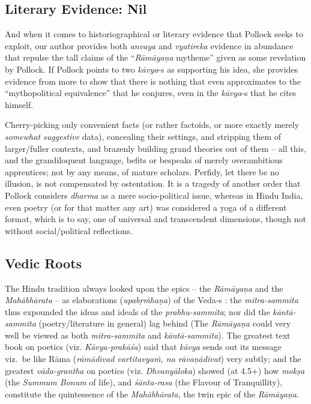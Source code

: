 \subsection*{Literary Evidence: Nil}

And when it comes to historiographical or literary evidence that Pollock seeks to exploit, our author provides both {\sl anvaya} and {\sl vyatireka} evidence in abundance that repulse the tall claims of  the “{\sl Rāmāyaṇa} mytheme” given as some revelation by Pollock. If Pollock points to two {\sl kāvya}-s as supporting his idea, she provides evidence from more to show that there is nothing that even approximates to the “mythopolitical equivalence” that he conjures, even in the {\sl kāvya}-s that he cites himself.

Cherry-picking only convenient facts (or rather factoids, or more exactly merely {\sl somewhat suggestive} data), concealing their settings, and stripping them of larger/fuller contexts, and brazenly building grand theories out of them -- all this, and the grandiloquent language, befits or bespeaks of merely overambitious apprentices; not by any means, of mature scholars. Perfidy, let there be no illusion, is not compensated by ostentation. It is a tragedy of another order that Pollock considers {\sl dharma} as a mere socio-political issue, whereas in Hindu India, even poetry (or for that matter any art) was considered a yoga of a different format, which is to say, one of universal and transcendent dimensions, though not without social/political reflections.\\[-20pt] 

\subsection*{Vedic Roots}

The Hindu tradition always looked upon the epics -- the {\sl Rāmāyaṇa} and the {\sl Mahābhārata} -- as elaborations ({\sl upabṛṁhaṇa}) of the Veda-s : the {\sl mitra-sammita} thus expounded the ideas and ideals  of the {\sl prabhu-\break\-sammita}; nor did the {\sl kāntā-sammita} (poetry/literature in general) lag behind (The {\sl Rāmāyaṇa} could very well be viewed as both {\sl mitra-sammita} and {\sl kāntā-sammita}). The greatest text book on poetics (viz. {\sl Kāvya-prakāśa}) said that {\sl kāvya} sends out its message viz.\ be like Rāma ({\sl rāmādivad vartitavyaṁ, na rāvaṇādivat}) very subtly; and the greatest {\sl vāda-grantha} on poetics (viz. {\sl Dhvanyāloka}) showed (at 4.5+) how {\sl mokṣa} (the {\sl Summum Bonum} of life), and {\sl śānta-rasa} (the Flavour of Tranquillity), constitute the quintessence of the {\sl Mahābhārata}, the twin epic of the {\sl Rāmāyaṇa}.\\[-20pt]

